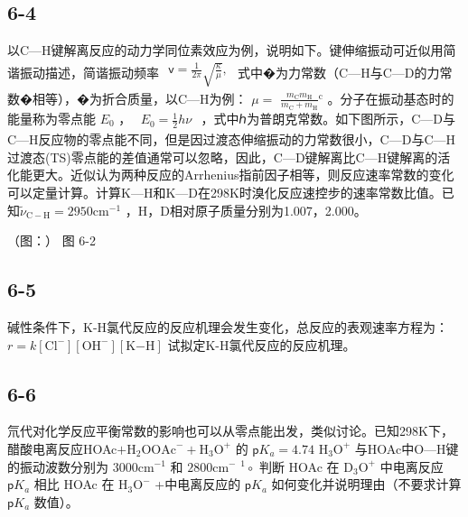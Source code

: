 \subsection*{6-4}
以C—H键解离反应的动⼒学同位素效应为例，说明如下。键伸缩振动可近似⽤简谐振动描述，简谐振动频率 $\begin{array} { r } { \mathsf { v } = \frac { 1 } { 2 \pi } \sqrt { \frac { \kappa } { \mu } } , } \end{array}$ 式中�为⼒常数（C—H与C—D的⼒常数�相等），�为折合质量，以C—H为例： $\mu =$ $\frac { m _ { \mathrm { C } } m _ { \mathrm { H } } } { m _ { \mathrm { C } } + m _ { \mathrm { H } } } { \mathrm { ^ c } }$ 。分⼦在振动基态时的能量称为零点能 $E _ { 0 }$ ， $\begin{array} { r } { E _ { 0 } = \frac 1 2 h \nu } \end{array}$ ，式中ℎ为普朗克常数。如下图所⽰，C—D与C—H反应物的零点能不同，但是因过渡态伸缩振动的⼒常数很⼩，C—D与C—H过渡态(TS)零点能的差值通常可以忽略，因此，C—D键解离⽐C—H键解离的活化能更⼤。近似认为两种反应的Arrhenius指前因⼦相等，则反应速率常数的变化可以定量计算。计算K—H和K—D在298K时溴化反应速控步的速率常数⽐值。已知$\widetilde { \nu } _ { \mathrm { C - H } } = 2 9 5 0 \mathrm { c m } ^ { - 1 }$ ，H，D相对原⼦质量分别为1.007，2.000。

（图：）
图 6-2

\subsection*{6-5}
碱性条件下，K-H氯代反应的反应机理会发⽣变化，总反应的表观速率⽅程为： $r = k [ \mathrm { C l ^ { - } } ] [ \mathrm { O H ^ { - } } ] [ \mathrm { K \mathrm { - } H } ]$ 试拟定K-H氯代反应的反应机理。

\subsection*{6-6}
氘代对化学反应平衡常数的影响也可以从零点能出发，类似讨论。已知298K下，醋酸电离反应HOAc$+ \mathrm { H } _ { 2 } \mathrm { O }  \mathrm { O A c } ^ { - } + \mathrm { H } _ { 3 } \mathrm { O } ^ { + }$ 的 $\mathsf { p } K _ { a } = 4 . 7 4$ $\mathrm { H _ { 3 } O ^ { + } }$ 与HOAc中O—H键的振动波数分别为 $3 0 0 0 \mathrm { c m } ^ { - 1 }$ 和 $2 8 0 0 \mathrm { c m } ^ { - }$ $^ 1 \circ$ 判断 HOAc 在 $\mathrm { D } _ { 3 } \mathrm { O } ^ { + }$ 中电离反应 $\mathsf { p } K _ { a }$ 相⽐ HOAc 在 $\mathrm { H _ { 3 } O ^ { - } }$ +中电离反应的 $\mathsf { p } K _ { a }$ 如何变化并说明理由（不要求计算$\mathsf { p } K _ { a }$ 数值）。

